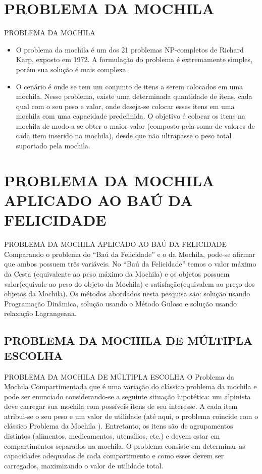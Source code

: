 \documentclass[	english,			%
	brazil,]{beamer}
\begin{document}
\section{PROBLEMA DA MOCHILA}
\begin{frame}{PROBLEMA DA MOCHILA}
\begin{itemize}
\item O problema da mochila é um dos 21 problemas NP-completos de Richard Karp, exposto em 1972. A formulação do problema é extremamente simples, porém sua solução é mais complexa.

\item	O cenário é onde se tem um conjunto de itens a serem colocados em uma mochila. Nesse problema, existe uma determinada quantidade de itens, cada qual com o seu peso e valor, onde deseja-se colocar esses itens em uma mochila com uma capacidade predefinida. O objetivo é colocar os itens na mochila de modo a se obter o maior valor (composto pela soma de valores de cada item inserido na mochila), desde que não ultrapasse o peso total suportado pela mochila.
\end{itemize}
\end{frame}


\section{PROBLEMA DA MOCHILA APLICADO AO BAÚ DA FELICIDADE}
\begin{frame}{PROBLEMA DA MOCHILA APLICADO AO BAÚ DA FELICIDADE}
Comparando o problema do “Baú da Felicidade” e o da Mochila, pode-se afirmar que ambos possuem três variáveis. No “Baú da Felicidade” temos o valor máximo da Cesta (equivalente ao peso máximo da Mochila) e os objetos possuem valor(equivale ao peso do objeto da Mochila) e satisfação(equivalem ao preço dos objetos da Mochila).
Os métodos abordados nesta pesquisa são: solução usando Programação Dinâmica, solução usando o Método Guloso e solução usando relaxação Lagrangeana.
\end{frame}

\subsection{PROBLEMA DA MOCHILA DE MÚLTIPLA ESCOLHA}
\begin{frame}{PROBLEMA DA MOCHILA DE MÚLTIPLA ESCOLHA}
	O Problema da Mochila Compartimentada que é uma variação do clássico problema da mochila e pode ser enunciado considerando-se a seguinte situação hipotética: um alpinista deve carregar sua mochila com possíveis itens de seu interesse. A cada item atribui-se o seu peso e um valor de utilidade (até aqui, o problema coincide com o clássico Problema da Mochila ). Entretanto, os itens são de agrupamentos distintos (alimentos, medicamentos, utensílios, etc.) e devem estar em compartimentos separados na mochila. O problema consiste em determinar as capacidades adequadas de cada compartimento e como esses devem ser carregados, maximizando o valor de utilidade total.
\end{frame}
\end{document}
